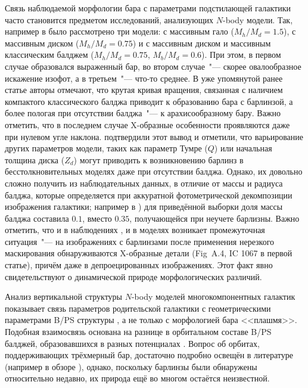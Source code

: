 \documentclass{trlnotes}
\begin{document}
Связь наблюдаемой морфологии бара с параметрами подстилающей галактики часто становится предметом исследований, 
анализующих $N$-body модели. Так, например в \citet{athanassoula2002} было рассмотрено три модели: с массивным гало 
($M_h/M_d = 1.5$), с массивным диском ($M_h/M_d = 0.75$) и с массивным диском и массивным классическим балджем 
($M_h/M_d = 0.75$, $M_b/M_d = 0.6$). При этом, в первом случае образовался выраженный бар, во втором случае~"--- 
скорее овалообразное искажение изофот, а в третьем~"--- что-то среднее. В уже упомянутой ранее 
статье \cite{salo2017} авторы отмечают, что крутая кривая вращения, связанная с наличием компактого классического 
балджа приводит к образованию бара с барлинзой, а более пологая при отсутствии балджа~"--- к арахисообразному 
бару. Важно отметить, что в последнем случае X-образные особенности проявляются даже при нулевом угле наклона.  
\citet{smirnov2018} подтвердили этот вывод и отметили, что варьирование других параметров модели, таких как 
параметр Тумре ($Q$) или начальная толщина диска ($Z_d$) могут приводить к возникновению барлинз в 
бесстолкновительных моделях даже при отсутствии балджа. Однако, их довольно сложно получить из наблюдательных 
данных, в отличие от массы и радиуса балджа, которые определяется при аккуратной фотометрической декомпозиции 
изображения галактики; например в \citet{laurikainen2014}) для приведённой выборки доля массы балджа составила
$0.1$, вместо $0.35$, получающейся при неучете барлизны. Важно отметить, что и в наблюдениях
\citep{laurikainen2017}, и в моделях \citep{salo2017} возникает промежуточная ситуация~"--- на изображениях с
барлинзами после применения нерезкого маскирования обнаруживаются X-образные детали (Fig~A.4, IC 1067 в первой
статье), причём даже в депроецированных изображениях. Этот факт явно свидетельствуют о динамической природе
морфологических различий. 

Анализ вертикальной структуры $N$-body моделей многокомпонентных галактик показывает связь параметров родительской
галактики с геометрическими параметрами B/PS структуры \citep{smirnov2018}, а не только с морфологией бара
<<плашмя>>. Подобная взаимосвязь основана на разнице в орбитальном составе B/PS балджей, образовавшихся в разных
потенциалах \citep{parul2020}. Вопрос об орбитах, поддерживающих трёхмерный бар, достаточно подробно освещён в
литературе (например в обзоре \cite{athanassoula2016}), однако, поскольку барлинзы были обнаружены относительно
недавно, их природа ещё во многом остаётся неизвестной. 
\end{document}
